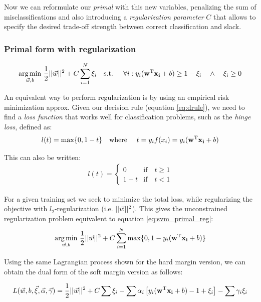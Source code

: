 Now we can reformulate our \emph{primal} with this new variables, penalizing the sum of misclassifications and also introducing a \emph{regularization parameter} $C$ that allows to specify the desired trade-off strength between correct classification and slack.

\subsubsection*{Primal form with regularization}
\begin{align}\label{eq:svm_primal_reg} 
    \underset{\vec{w}, b}{\text{arg} \min}\ \frac{1}{2} ||\vec{w}||^2 + C \sum_{i=1}^{N} \xi_i
    \text{\quad s.t. \quad} 
    \forall i : y_i (\mathbf{w}^{\text{T}} \mathbf{x_i} + b) \ge 1 - \xi_i \quad \land \quad \xi_i \ge 0
\end{align}

An equivalent way to perform regularization is by using an empirical risk mini\-mization approx. Given our decision rule (equation \ref{eq:drule}), we need to find a \emph{loss function} that works well for classification problems, such as the \emph{hinge loss}, defined as:
\begin{align}
    l(t) = \max \{0, 1 - t\} \text{\quad where \quad} t = y_if(x_i) = y_i (\mathbf{w}^{\text{T}} \mathbf{x_i} + b)
\end{align}

This can also be written:
\begin{align*}
    l(t) = \left\{
        \begin{array}{ll}
            0   & \mbox{if} \quad t \ge 1 \\
            1-t & \mbox{if} \quad t < 1  
        \end{array}
    \right.
\end{align*}

For a given training set we seek to minimize the total loss, while regularizing the objective with $l_2$-regularization (i.e. $||\vec{w}||^2$). This gives the unconstrained reg\-u\-lar\-iza\-tion problem equivalent to equation \ref{eq:svm_primal_reg}:
\begin{align}
    \underset{\vec{w}, b}{\text{arg} \min}\ \frac{1}{2} ||\vec{w}||^2 + C \sum_{i=1}^{N} \max \{0, 1 -  y_i (\mathbf{w}^{\text{T}} \mathbf{x_i} + b)\}
\end{align}

Using the same Lagrangian process shown for the hard margin version, we can obtain the dual form of the soft margin version as follows:

\begin{align*}
    L(\vec{w}, b, \vec{\xi}, \vec{\alpha}, \vec{\gamma}) = 
    \frac{1}{2} ||\vec{w}||^2 + C \sum \xi_i
    - \sum \alpha_i \left[ y_i (\mathbf{w}^{\text{T}} \mathbf{x_i} + b) - 1 + \xi_i \right]
    - \sum \gamma_i \xi_i
\end{align*}

